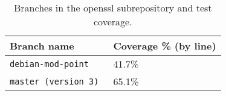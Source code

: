 \documentclass[conference]{IEEEtran}
\begin{document}
\begin{table*}[!t]
  \centering
  \begin{tabular}{|l|l|}
    \hline
    Branch name & Coverage \%  (by line)\\ \hline
    \verb|debian-mod-point| & 41.7\% \\ \hline
    \verb|master (version 3) | & 65.1\% \\ \hline
  \end{tabular}
  \caption{Branches in the openssl subrepository and test coverage.}
  \label{branches-coverage}
\end{table*}
\end{document}
